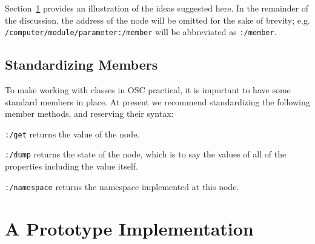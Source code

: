 \documentclass{NIME-alternate}
\newenvironment{packed_item}{
\begin{itemize}
  \setlength{\itemsep}{1pt}
  \setlength{\parskip}{0pt}
  \setlength{\parsep}{0pt}
}{\end{itemize}}
\begin{document}


Section~\ref{sec:prototype_implementation} provides an illustration of the ideas suggested here. In the remainder of the discussion, the address of the node will be omitted for the sake of brevity; e.g.\\ 
\texttt{/computer/module/parameter:/member}  
will be abbreviated as \texttt{:/member}.



\subsection{Standardizing Members} %
\label{sub:standardizing_members}

To make working with classes in OSC practical, it is important to have some standard members in place. At present we recommend standardizing the following member methods, and reserving their syntax:
\begin{packed_item}%
	\item \texttt{:/get} returns the value of the node.
	\item \texttt{:/dump} returns the state of the node, which is to say the values of all of the properties including the value itself.
	\item \texttt{:/namespace} returns the namespace implemented at this node.
\end{packed_item}%





\section{A Prototype Implementation} %
\label{sec:prototype_implementation}
\end{document}
